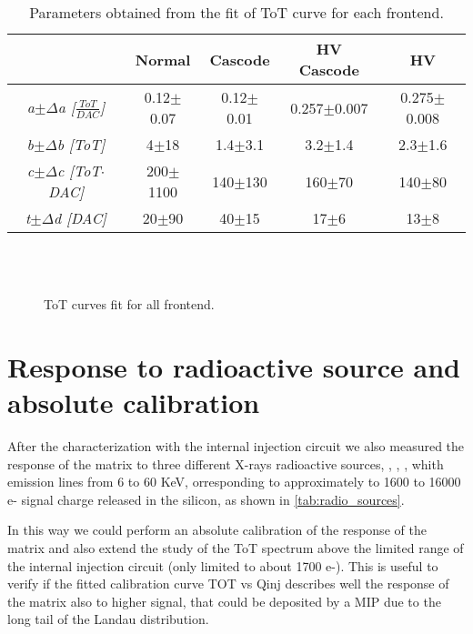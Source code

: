 \begin{table}[h!]
\centering
\begin{tabular}{c|c|c|c|c}
 & \textbf{Normal} & \textbf{Cascode} & \textbf{HV Cascode} & \textbf{HV} \\
\hline
\hline
\textit{a$\pm\Delta$a [$\frac{ToT}{DAC}$]} & 0.12$\pm$0.07 & 0.12$\pm$0.01 & 0.257$\pm$0.007 & 0.275$\pm$0.008 \\
\hline
\textit{b$\pm\Delta$b [ToT]} & 4$\pm$18 & 1.4$\pm$3.1 & 3.2$\pm$1.4 & 2.3$\pm$1.6 \\
\hline
\textit{c$\pm\Delta$c [ToT$\cdot$DAC]} & 200$\pm$1100 & 140$\pm$130 & 160$\pm$70 & 140$\pm$80 \\
\hline
\textit{t$\pm\Delta$d [DAC]} & 20$\pm$90 & 40$\pm$15 & 17$\pm$6 & 13$\pm$8 \\
\hline
\hline
\end{tabular}
\caption{Parameters obtained from the fit of ToT curve for each frontend.}
\label{tab:th_fe}
\end{table}

\begin{figure}[h!]
\centering
{}\quad
{}\\
\quad
{}\\
\caption{ToT curves fit for all frontend.}
\label{fig:tot_fe}
\end{figure}


\section{Response to radioactive source and absolute calibration} \label{sec:source_ana}


After the characterization with the internal injection circuit we also measured the response of the matrix to three different X-rays radioactive sources, , , , whith emission lines from 6 to 60 KeV, orresponding to approximately to 1600 to 16000 e- signal charge released in the silicon, as shown in \autoref{tab:radio_sources}.

In this way we could perform an absolute calibration of the response of the matrix and also extend the study of the ToT spectrum above the limited range of the internal injection circuit (only limited to about 1700 e-). This is useful to verify if the fitted calibration curve TOT vs Qinj describes well the response of the matrix also to higher signal, that could be deposited by a MIP due to the long tail of the Landau distribution. 

